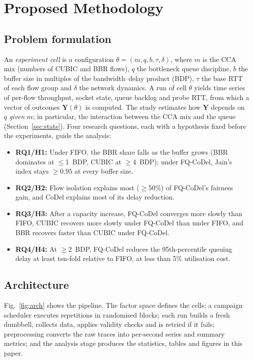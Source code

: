 \documentclass[conference]{IEEEtran}
\begin{document}
\section{Proposed Methodology}
\label{sec:method}

\subsection{Problem formulation}
An \emph{experiment cell} is a configuration $\theta=(m,q,b,\tau,\delta)$, where $m$ is the CCA mix (numbers of CUBIC and BBR flows), $q$ the bottleneck queue discipline, $b$ the buffer size in multiples of the bandwidth--delay product (BDP), $\tau$ the base RTT of each flow group and $\delta$ the network dynamics. A run of cell $\theta$ yields time series of per-flow throughput, socket state, queue backlog and probe RTT, from which a vector of outcomes $\mathbf{Y}(\theta)$ is computed. The study estimates how $\mathbf{Y}$ depends on $q$ \emph{given} $m$; in particular, the interaction between the CCA mix and the queue (Section~\ref{sec:stats}). Four research questions, each with a hypothesis fixed before the experiments, guide the analysis:
\begin{itemize}
  \item \textbf{RQ1/H1:} Under FIFO, the BBR share falls as the buffer grows (BBR dominates at $\le$1~BDP, CUBIC at $\ge$4~BDP); under FQ-CoDel, Jain's index stays $\ge 0.95$ at every buffer size.
  \item \textbf{RQ2/H2:} Flow isolation explains most ($\ge$50\%) of FQ-CoDel's fairness gain, and CoDel explains most of its delay reduction.
  \item \textbf{RQ3/H3:} After a capacity increase, FQ-CoDel converges more slowly than FIFO, CUBIC recovers more slowly under FQ-CoDel than under FIFO, and BBR recovers faster than CUBIC under FQ-CoDel.
  \item \textbf{RQ4/H4:} At $\ge$2~BDP, FQ-CoDel reduces the 95th-percentile queuing delay at least ten-fold relative to FIFO, at less than 5\% utilisation cost.
\end{itemize}

\subsection{Architecture}
Fig.~\ref{fig:arch} shows the pipeline. The factor space defines the cells; a campaign scheduler executes repetitions in randomised blocks; each run builds a fresh dumbbell, collects data, applies validity checks and is retried if it fails; preprocessing converts the raw traces into per-second series and summary metrics; and the analysis stage produces the statistics, tables and figures in this paper.
\end{document}
